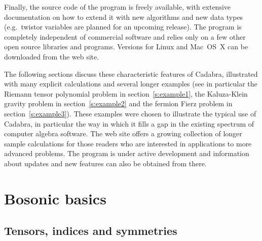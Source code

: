 \documentclass[11pt]{article}
\newcommand{\Cdb}{{Cadabra}\xspace}
\begin{document}
Finally, the source code of the program is freely available, with
extensive documentation on how to extend it with new algorithms and
new data types (e.g.~twistor variables are planned for an upcoming
release). The program is completely independent of commercial software
and relies only on a few other open source libraries and
programs. Versions for Linux and Mac~OS~X can be downloaded from the
web site.

\medskip

The following sections discuss these characteristic features of \Cdb,
illustrated with many explicit calculations and several longer
examples (see in particular the Riemann tensor polynomial problem in
section~\ref{s:example1}, the Kaluza-Klein gravity problem in
section~\ref{s:example2} and the fermion Fierz problem in
section~\ref{s:example3}). These examples were chosen to illustrate
the typical use of \Cdb, in particular the way in which it fills a gap
in the existing spectrum of computer algebra software. The web site
offers a growing collection of longer sample calculations for those
readers who are interested in applications to more advanced problems.
The program is under active development and information about updates
and new features can also be obtained from there.

\section{Bosonic basics}
\subsection{Tensors, indices and symmetries}
\end{document}
